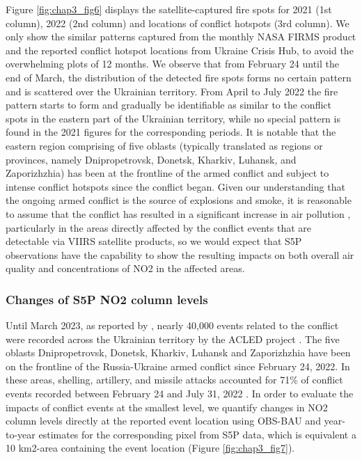 Figure \ref{fig:chap3_fig6} displays the satellite-captured fire spots for 2021 (1st column), 2022 (2nd column) and locations of conflict hotspots (3rd column). We only show the similar patterns captured from the monthly NASA FIRMS product and the reported conflict hotspot locations from Ukraine Crisis Hub, to avoid the overwhelming plots of 12 months. We observe that from February 24 until the end of March, the distribution of the detected fire spots forms no certain pattern and is scattered over the Ukrainian territory. From April to July 2022 the fire pattern starts to form and gradually be identifiable as similar to the conflict spots in the eastern part of the Ukrainian territory, while no special pattern is found in the 2021 figures for the corresponding periods. It is notable that the eastern region comprising of five oblasts (typically translated as regions or provinces, namely Dnipropetrovsk, Donetsk, Kharkiv, Luhansk, and Zaporizhzhia) has been at the frontline of the armed conflict and subject to intense conflict hotspots since the conflict began. Given our understanding that the ongoing armed conflict is the source of explosions and smoke, it is reasonable to assume that the conflict has resulted in a significant increase in air pollution \citep{pereira2022russian}, particularly in the areas directly affected by the conflict events that are detectable via VIIRS satellite products, so we would expect that S5P observations have the capability to show the resulting impacts on both overall air quality and concentrations of NO2 in the affected areas.\par
\subsubsection*{Changes of S5P NO2 column levels}
Until March 2023, as reported by \citep{nichita2023}, nearly 40,000 events related to the conflict were recorded across the Ukrainian territory by the ACLED project \citep{raleigh2010introducing}. The five oblasts Dnipropetrovsk, Donetsk, Kharkiv, Luhansk and Zaporizhzhia have been on the frontline of the Russia-Ukraine armed conflict since February 24, 2022. In these areas, shelling, artillery, and missile attacks accounted for 71\% of conflict events recorded between February 24 and July 31, 2022 \citep{nichita2023}. In order to evaluate the impacts of conflict events at the smallest level, we quantify changes in NO2 column levels directly at the reported event location using OBS-BAU and year-to-year estimates for the corresponding pixel from S5P data, which is equivalent a 10 km2-area containing the event location (Figure \ref{fig:chap3_fig7}). \par


